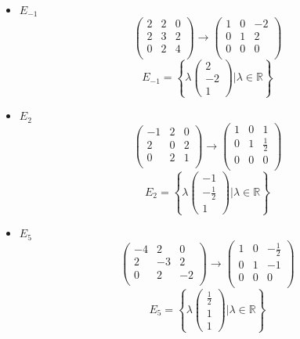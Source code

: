 \documentclass[lineaire_algebra_oplossingen.tex]{subfiles}
\begin{document}
\begin{itemize}
\item $E_{-1}$
\[
\begin{pmatrix}
2 & 2 & 0\\
2 & 3 & 2\\
0 & 2 & 4\\
\end{pmatrix}
\rightarrow
\begin{pmatrix}
1 & 0 & -2\\
0 & 1 & 2\\
0 & 0 & 0\\
\end{pmatrix}
\]
\[
E_{-1} = 
\left\{ 
\lambda
\begin{pmatrix}
2 \\ -2\\ 1
\end{pmatrix}
| \lambda \in \mathbb{R}
\right\}
\]

\item $E_{2}$
\[
\begin{pmatrix}
-1 & 2 & 0\\
2 & 0 & 2\\
0 & 2 & 1\\
\end{pmatrix}
\rightarrow
\begin{pmatrix}
1 & 0 & 1\\
0 & 1 & \frac{1}{2}\\
0 & 0 & 0\\
\end{pmatrix}
\]
\[
E_{2} = 
\left\{ 
\lambda
\begin{pmatrix}
-1 \\ -\frac{1}{2} \\ 1
\end{pmatrix}
| \lambda \in \mathbb{R}
\right\}
\]

\item $E_{5}$
\[
\begin{pmatrix}
-4 & 2 & 0\\
2 & -3 & 2\\
0 & 2 & -2\\
\end{pmatrix}
\rightarrow
\begin{pmatrix}
1 & 0 & -\frac{1}{2}\\
0 & 1 & -1\\
0 & 0 & 0\\
\end{pmatrix}
\]
\[
E_{5} = 
\left\{ 
\lambda
\begin{pmatrix}
\frac{1}{2} \\ 1 \\ 1
\end{pmatrix}
| \lambda \in \mathbb{R}
\right\}
\]
\end{itemize}
\end{document}
